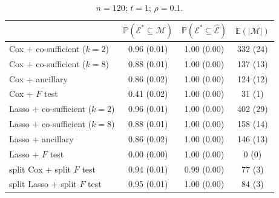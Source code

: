 \documentclass[10pt, reqno]{amsart}
\numberwithin{equation}{section}
\begin{document}

\begin{table}
	\caption{$n = 120$; $t = 1$; $\rho = 0.1$.}{
		\centering
		\begin{tabular}{|l|c|c|c|}
			\hline
			& $\mathbb{P}(\mathcal E^*\subseteq \mathcal{M})$
			& $\mathbb{P}(\mathcal E^*\subseteq \hat{\mathcal{E}})$
			& $\mathbb E(\vert \mathcal{M} \vert)$ \\
			\hline
			Cox + co-sufficient ($k = 2$) & 0.96 (0.01) & 1.00 (0.00) & 332 (24) \\
			Cox + co-sufficient ($k = 8$) & 0.88 (0.01) & 1.00 (0.00) & 137 (13) \\
			Cox + ancillary               & 0.86 (0.02) & 1.00 (0.00) & 124 (12) \\
			Cox + $F$ test                & 0.41 (0.02) & 1.00 (0.00) & 31 (1) \\
			Lasso + co-sufficient ($k = 2$) & 0.96 (0.01) & 1.00 (0.00) & 402 (29) \\
			Lasso + co-sufficient ($k = 8$) & 0.88 (0.01) & 1.00 (0.00) & 158 (14) \\
			Lasso + ancillary               & 0.86 (0.02) & 1.00 (0.00) & 146 (13) \\
			Lasso + $F$ test                & 0.00 (0.00) & 1.00 (0.00) & 0 (0) \\
			split Cox + split $F$ test      & 0.94 (0.01) & 0.99 (0.00) & 77 (3) \\
			split Lasso + split $F$ test    & 0.95 (0.01) & 1.00 (0.00) & 84 (3) \\
			\hline
		\end{tabular}
		\label{tab_sim_new4}
	}
\end{table}

\end{document}
